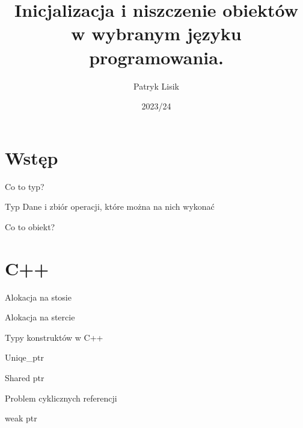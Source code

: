 \documentclass[xcolor=table]{beamer}
\title[Cykl życia obiektów]{Inicjalizacja i niszczenie obiektów w wybranym języku programowania.} %
\author{Patryk Lisik} %
\institute[] %
{
 Uniwersytet Łódzki \\ %
}
\date{2023/24} %
\begin{document}
\begin{frame}
\titlepage
\end{frame}

\section{Wstęp}

\begin{frame}{Co to typ?}
    \begin{block}{Typ}
        Dane i zbiór operacji, które można na nich wykonać \cite{IBM-What-is-type}
    \end{block}
\end{frame}


\begin{frame}{Co to obiekt?}
    
\end{frame}

\section{C++}

\begin{frame}{Alokacja na stosie}
    
\end{frame}

\begin{frame}{Alokacja na stercie}
    
\end{frame}


\begin{frame}{Typy konstruktów w C++}
    
\end{frame}


\begin{frame}{Uniqe\_ptr}
    
\end{frame}

\begin{frame}{Shared ptr}
    
\end{frame}

\begin{frame}{Problem cyklicznych referencji}
    
\end{frame}

\begin{frame}{weak ptr}

\end{frame}
\end{document}
